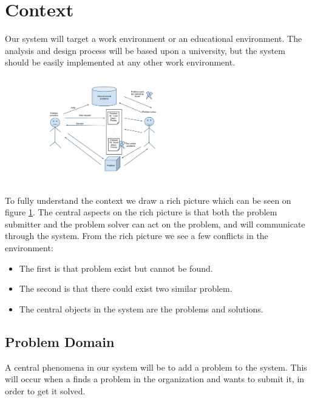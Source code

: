 \section{Context}
Our system will target a work environment or an educational environment.
The analysis and design process will be based upon a university, but the system should be easily implemented at any other work environment. 

\begin{figure}[H]%
\includegraphics[scale = 0.45]{input/background/rich_picture.pdf}%
%
\label{fig:rich_picture}%
\end{figure}

To fully understand the context we draw a rich picture which can be seen on figure \ref{fig:rich_picture}. 
The central aspects on the rich picture is that both the problem submitter and the problem solver can act on the problem, and will communicate through the system. 
From the rich picture we see a few conflicts in the environment:
\begin{itemize}
		\item The first is that problem exist but cannot be found.
		\item The second is that there could exist two similar problem.
		\item The central objects in the system are the problems and solutions.
\end{itemize} 

\subsection{Problem Domain}
A central phenomena in our system will be to add a problem to the system.
This will occur when a \aclient[] finds a problem in the organization and wants to submit it, in order to get it solved.


